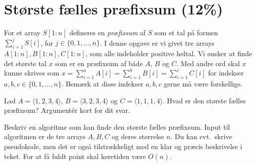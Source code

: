 



\section{Største fælles præfixsum (12\%)}

For et array $S[1\!:\!n]$ defineres en \emph{præfixsum} af $S$ som et tal på formen $\sum_{i=1}^jS[i]$, for $j\in\{0,1,\ldots,n\}$.
I denne opgave er vi givet tre arrays $A[1\!:\!n],B[1\!:\!n],C[1\!:\!n]$, som alle indeholder positive heltal.
Vi ønsker at finde det største tal $x$ som er en præfixsum af både $A$, $B$ og $C$.
Med andre ord skal $x$ kunne skrives som $x=\sum_{i=1}^aA[i]=\sum_{i=1}^bB[i]=\sum_{i=1}^cC[i]$ for indekser $a,b,c\in\{0,1,\ldots,n\}$.
Bemærk at disse indekser $a,b,c$ gerne må være forskellige.

{Lad $A=\langle 1,2,3,4\rangle$, $B=\langle 3,2,3,4\rangle$ og $C=\langle 1,1,1,4\rangle$.
Hvad er den største fælles præfixsum? Argumentér kort for dit svar.}


{Beskriv en algoritme som kan finde den største fælles præfixsum.
Input til algoritmen er de tre arrays $A,B,C$ og deres størrelse $n$.
Du kan evt.~skrive pseudokode, men det er også tilstrækkeligt med en klar og præcis beskrivelse i tekst.
For at få fuldt point skal køretiden være $O(n)$.}

